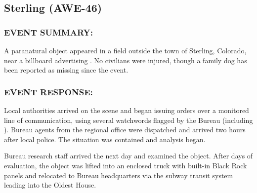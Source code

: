 \subsection*{Sterling (AWE-46)}
\subsubsection*{EVENT SUMMARY:}
\par A paranatural object appeared in a field outside the town of
Sterling, Colorado, near a billboard advertising . No
civilians were injured, though a family dog has been reported as
missing since the event.
\subsubsection*{EVENT RESPONSE:}
\par Local authorities arrived on the scene and began issuing orders
over a monitored line of communication, using several
watchwords flagged by the Bureau (including \censor{super mega long text yeah]}).
Bureau agents from the regional office were dispatched and arrived two hours after local police.
The situation was contained and analysis began.
\par Bureau research staff arrived the next day and examined the
object. After 
days of evaluation, the object was lifted into an
enclosed truck with built-in Black Rock panels and relocated to
Bureau headquarters via the subway transit system leading into
the Oldest House.